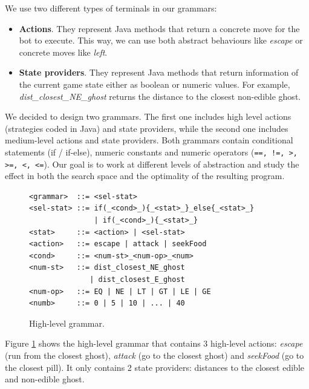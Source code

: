 \documentclass{llncs}
\begin{document}
We use two different types of terminals in our grammars:

\begin{itemize}
\item \textbf{Actions}. They represent Java methods that return a concrete move for the bot to execute. This way, we can use both abstract behaviours like \emph{escape} or concrete moves like \emph{left}.

\item \textbf{State providers}. They represent Java methods that return information of the current game state either as boolean or numeric values. For example, \emph{dist\_closest\_NE\_ghost} returns the distance to the closest non-edible ghost.
\end{itemize}

We decided to design two grammars. The first one includes high level actions (strategies coded in Java) and state providers, while the second one includes medium-level actions and state providers. Both grammars contain conditional statements (if / if-else), numeric constants and numeric operators (\texttt{==, !=, >, >=, <, <=}). Our goal is to work at different levels of abstraction and study the effect in both the search space and the optimality of the resulting program. 

\begin{figure}[tb]
	\centering
\begin{lstlisting}[frame=single, breaklines=false, basicstyle=\fontsize{10}{11}\ttfamily]
<grammar>  ::= <sel-stat>
<sel-stat> ::= if(_<cond>_){_<stat>_}_else{_<stat>_}
               | if(_<cond>_){_<stat>_}
<stat>     ::= <action> | <sel-stat>
<action>   ::= escape | attack | seekFood
<cond>     ::= <num-st>_<num-op>_<num>
<num-st>   ::= dist_closest_NE_ghost
              | dist_closest_E_ghost
<num-op>   ::= EQ | NE | LT | GT | LE | GE
<numb>     ::= 0 | 5 | 10 | ... | 40
\end{lstlisting} %
	\caption{High-level grammar.}
	\label{fig:hl-grammar}
\end{figure}

Figure \ref{fig:hl-grammar} shows the high-level grammar that contains 3 high-level actions: \emph{escape} (run from the closest ghost), \emph{attack} (go to the closest ghost) and \emph{seekFood} (go to the closest pill). It only contains 2 state providers: distances to the closest edible and non-edible ghost.
\end{document}
